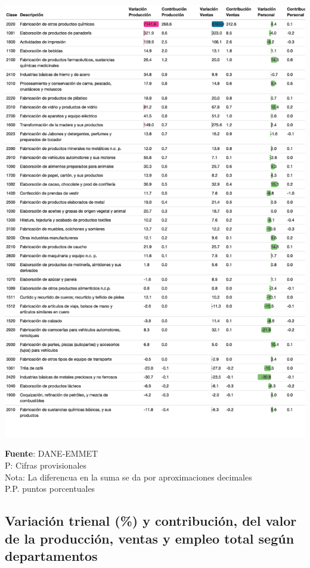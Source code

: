 \documentclass[
]{article}
\begin{document}
\includegraphics{boletin_files/figure-latex/tabla13_view-1.png}

\textbf{Fuente}: DANE-EMMET\\
P: Cifras provisionales\\
Nota: La diferencua en la suma se da por aproximaciones decimales\\
P.P. puntos porcentuales\\

\hypertarget{variaciuxf3n-trienal-y-contribuciuxf3n-del-valor-de-la-producciuxf3n-ventas-y-empleo-total-seguxfan-departamentos}{%
\subsection{Variación trienal (\%) y contribución, del valor de la
producción, ventas y empleo total según
departamentos}\label{variaciuxf3n-trienal-y-contribuciuxf3n-del-valor-de-la-producciuxf3n-ventas-y-empleo-total-seguxfan-departamentos}}
\end{document}
